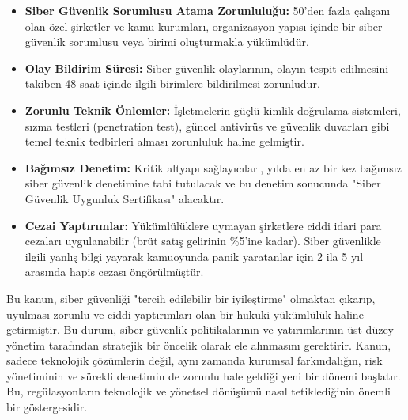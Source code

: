 \begin{itemize}
    \item \textbf{Siber Güvenlik Sorumlusu Atama Zorunluluğu:} 50'den fazla çalışanı olan özel şirketler ve kamu kurumları, organizasyon yapısı içinde bir siber güvenlik sorumlusu veya birimi oluşturmakla yükümlüdür.
    \item \textbf{Olay Bildirim Süresi:} Siber güvenlik olaylarının, olayın tespit edilmesini takiben 48 saat içinde ilgili birimlere bildirilmesi zorunludur.
    \item \textbf{Zorunlu Teknik Önlemler:} İşletmelerin güçlü kimlik doğrulama sistemleri, sızma testleri (penetration test), güncel antivirüs ve güvenlik duvarları gibi temel teknik tedbirleri alması zorunluluk haline gelmiştir.
    \item \textbf{Bağımsız Denetim:} Kritik altyapı sağlayıcıları, yılda en az bir kez bağımsız siber güvenlik denetimine tabi tutulacak ve bu denetim sonucunda "Siber Güvenlik Uygunluk Sertifikası" alacaktır.
    \item \textbf{Cezai Yaptırımlar:} Yükümlülüklere uymayan şirketlere ciddi idari para cezaları uygulanabilir (brüt satış gelirinin \%5'ine kadar). Siber güvenlikle ilgili yanlış bilgi yayarak kamuoyunda panik yaratanlar için 2 ila 5 yıl arasında hapis cezası öngörülmüştür.
\end{itemize}

Bu kanun, siber güvenliği "tercih edilebilir bir iyileştirme" olmaktan çıkarıp, uyulması zorunlu ve ciddi yaptırımları olan bir hukuki yükümlülük haline getirmiştir. Bu durum, siber güvenlik politikalarının ve yatırımlarının üst düzey yönetim tarafından stratejik bir öncelik olarak ele alınmasını gerektirir. Kanun, sadece teknolojik çözümlerin değil, aynı zamanda kurumsal farkındalığın, risk yönetiminin ve sürekli denetimin de zorunlu hale geldiği yeni bir dönemi başlatır. Bu, regülasyonların teknolojik ve yönetsel dönüşümü nasıl tetiklediğinin önemli bir göstergesidir.
